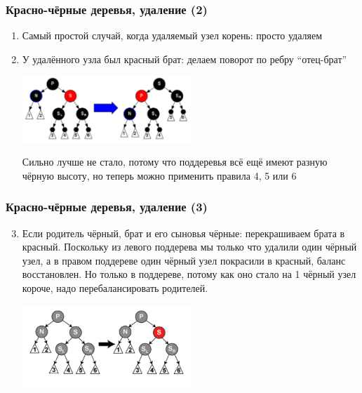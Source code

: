 \documentclass{../../slides-style}
\begin{document}
    \begin{frame}
        \frametitle{Красно-чёрные деревья, удаление (2)}
        \begin{enumerate}
            \item Самый простой случай, когда удаляемый узел корень: просто удаляем
            \item У удалённого узла был красный брат: делаем поворот по ребру ``отец-брат''
            \begin{center}
                \includegraphics[width=0.5\textwidth]{deletion-from-red-black-tree.png}
            \end{center}
            Сильно лучше не стало, потому что поддеревья всё ещё имеют разную чёрную высоту, но теперь можно применить правила 4, 5 или 6
        \end{enumerate}
    \end{frame}

    \begin{frame}
        \frametitle{Красно-чёрные деревья, удаление (3)}
        \begin{enumerate}
            \setcounter{enumi}{2}
            \item Если родитель чёрный, брат и его сыновья чёрные: перекрашиваем брата в красный. Поскольку из левого поддерева мы только что удалили один чёрный узел, а в правом поддереве один чёрный узел покрасили в красный, баланс восстановлен. Но только в поддереве, потому как оно стало на 1 чёрный узел короче, надо перебалансировать родителей.
            \begin{center}
                \includegraphics[width=0.5\textwidth]{deletion-from-red-black-tree2.png}
            \end{center}
        \end{enumerate}
    \end{frame}
\end{document}
